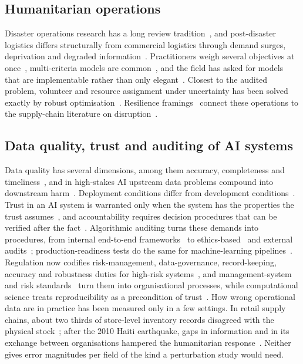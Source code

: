 \documentclass[systems,article,submit,moreauthors,pdftex]{Definitions/mdpi}
\begin{document}
\subsection{Humanitarian operations}
Disaster operations research has a long review
tradition~\cite{altay2006ormsdisaster,galindo2013review,caunhye2012emergency}, and
post-disaster logistics differs structurally from commercial logistics through demand
surges, deprivation and degraded information~\cite{holguinveras2012unique,kovacs2007humanitarian,sheu2007emergency}.
Practitioners weigh several objectives at once~\cite{gralla2014tradeoffs}, multi-criteria
models are common~\cite{gutjahr2016multicriteria}, and the field has asked for models that
are implementable rather than only elegant~\cite{besiou2020humanitarian}. Closest to the
audited problem, volunteer and resource assignment under uncertainty has been solved
exactly by robust optimisation~\cite{lassiter2015volunteer}. Resilience
framings~\cite{bruneau2003resilience,christopher2004resilient,sheffi2005resilient,hosseini2019review}
connect these operations to the supply-chain literature on
disruption~\cite{queiroz2022epidemic,aghsami2024humanitarian}.

\subsection{Data quality, trust and auditing of AI systems}
Data quality has several dimensions, among them accuracy, completeness and
timeliness~\cite{wang1996dataquality}, and in high-stakes AI upstream data problems
compound into downstream harm~\cite{sambasivan2021cascades}. Deployment conditions differ
from development conditions~\cite{quinonerocandela2008shift,amodei2016concrete}.
Trust in an AI system is warranted only when the system has the properties the trust
assumes~\cite{jacovi2021trust}, and accountability requires decision procedures that can
be verified after the fact~\cite{kroll2017accountable,doshivelez2017interpretable}.
Algorithmic auditing turns these demands into procedures, from internal end-to-end
frameworks~\cite{raji2020audit} to ethics-based~\cite{mokander2021ethics} and external
audits~\cite{metaxa2021auditing}; production-readiness tests do the same for machine-learning
pipelines~\cite{breck2017mltestscore}. Regulation now codifies risk-management, data-governance,
record-keeping, accuracy and robustness duties for high-risk systems~\cite{eu2024aiact}, and
management-system and risk standards~\cite{iso2023aims,iso2023airisk,nist2023airmf} turn them
into organisational processes, while computational science treats reproducibility as a
precondition of trust~\cite{peng2011reproducible,stodden2016enhancing,gundersen2018reproducibility,pineau2021reproducibility,wilkinson2016fair}.
How wrong operational data are in practice has been measured only in a few settings. In
retail supply chains, about two thirds of store-level inventory records disagreed with the
physical stock~\cite{dehoratius2008inventory}; after the 2010 Haiti earthquake, gaps in
information and in its exchange between organisations hampered the humanitarian
response~\cite{altay2014haiti}. Neither gives error magnitudes per field of the kind a
perturbation study would need.
\end{document}
